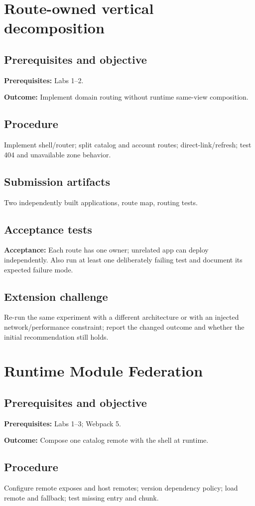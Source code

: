\documentclass[11pt,letterpaper,oneside]{report}
\newcommand{\criterion}[1]{\textbf{Acceptance:} #1}
\begin{document}
\chapter{Route-owned vertical decomposition}
\section{Prerequisites and objective}
\textbf{Prerequisites:} Labs 1--2.\par
\textbf{Outcome:} Implement domain routing without runtime same-view composition.
\section{Procedure}
Implement shell/router; split catalog and account routes; direct-link/refresh; test 404 and unavailable zone behavior.
\section{Submission artifacts}
Two independently built applications, route map, routing tests.
\section{Acceptance tests}
\criterion{Each route has one owner; unrelated app can deploy independently.} Also run at least one deliberately failing test and document its expected failure mode.
\section{Extension challenge}
Re-run the same experiment with a different architecture or with an injected network/performance constraint; report the changed outcome and whether the initial recommendation still holds.

\chapter{Runtime Module Federation}
\section{Prerequisites and objective}
\textbf{Prerequisites:} Labs 1--3; Webpack 5.\par
\textbf{Outcome:} Compose one catalog remote with the shell at runtime.
\section{Procedure}
Configure remote exposes and host remotes; version dependency policy; load remote and fallback; test missing entry and chunk.
\end{document}

